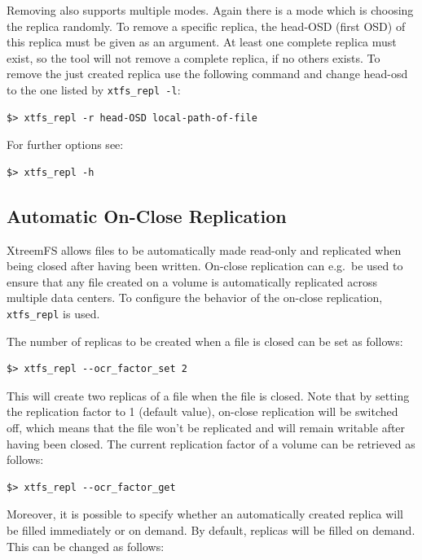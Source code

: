 \documentclass[a4paper,10pt]{book}
\begin{document}
Removing also supports multiple modes. Again there is a mode which is choosing the replica randomly. To remove a specific replica, the head-OSD (first OSD) of this replica must be given as an argument. At least one complete replica must exist, so the tool will not remove a complete replica, if no others exists. To remove the just created replica use the following command and change head-osd to the one listed by \texttt{xtfs\_repl -l}:

\begin{verbatim}
$> xtfs_repl -r head-OSD local-path-of-file
\end{verbatim}

For further options see:

\begin{verbatim}
$> xtfs_repl -h
\end{verbatim}

\subsection{Automatic On-Close Replication}

XtreemFS allows files to be automatically made read-only and replicated when being closed after having been written. On-close replication can e.g.\ be used to ensure that any file created on a volume is automatically replicated across multiple data centers. To configure the behavior of the on-close replication, \texttt{xtfs\_repl} is used.

The number of replicas to be created when a file is closed can be set as follows:

\begin{verbatim}
$> xtfs_repl --ocr_factor_set 2
\end{verbatim}

This will create two replicas of a file when the file is closed. Note that by setting the replication factor to 1 (default value), on-close replication will be switched off, which means that the file won't be replicated and will remain writable after having been closed. The current replication factor of a volume can be retrieved as follows:

\begin{verbatim}
$> xtfs_repl --ocr_factor_get
\end{verbatim}

Moreover, it is possible to specify whether an automatically created replica will be filled immediately or on demand. By default, replicas will be filled on demand. This can be changed as follows:
\end{document}
